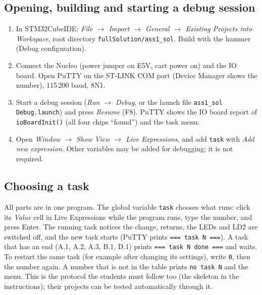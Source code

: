 \documentclass[11pt,a4paper]{article}
\newcommand{\lv}[1]{\texttt{#1}}                 %
\begin{document}
\subsection{Opening, building and starting a debug session}
\begin{enumerate}
  \item In STM32CubeIDE: \emph{File $\to$ Import $\to$ General $\to$ Existing Projects into Workspace}, root directory
        \texttt{fullSolution/ass1\_sol}. Build with the hammer (Debug configuration).
  \item Connect the Nucleo (power jumper on E5V, cart power on) and the IO board. Open PuTTY on the ST-LINK COM port (Device
        Manager shows the number), 115\,200 baud, 8N1.
  \item Start a debug session (\emph{Run $\to$ Debug}, or the launch file \texttt{ass1\_sol Debug.launch}) and press
        \emph{Resume} (F8). PuTTY shows the IO board report of \texttt{ioBoardInit()} (all four chips ``found'') and the
        task menu.
  \item Open \emph{Window $\to$ Show View $\to$ Live Expressions}, and add \lv{task} with \emph{Add new expression}.
        Other variables may be added for debugging; it is not required.
\end{enumerate}

\subsection{Choosing a task}
All parts are in one program. The global variable \lv{task} chooses what runs: click its \emph{Value} cell in Live
Expressions while the program runs, type the number, and press Enter. The running task notices the change, returns,
the LEDs and LD2 are switched off, and the new task starts (PuTTY prints \texttt{=== task N ===}). A task that has an
end (A.1, A.2, A.3, B.1, D.1) prints \texttt{=== task N done ===} and waits. To restart the same task (for example
after changing its settings), write \texttt{0}, then the number again. A number that is not in the table prints
\texttt{no task N} and the menu. This is the protocol the students must follow too (the skeleton in the instructions);
their projects can be tested automatically through it.
\end{document}
